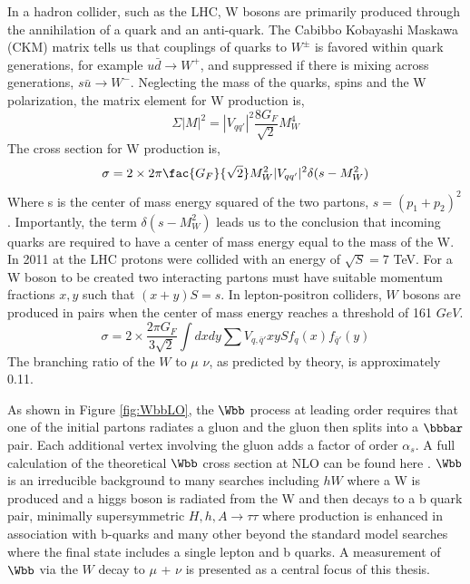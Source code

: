 In a hadron collider, such as the LHC, W bosons are primarily produced
through the annihilation of a quark and an anti-quark. 
The Cabibbo Kobayashi Maskawa (CKM) matrix tells us that%
couplings of quarks to $W^{\pm}$ is favored within quark generations, for example
$u\bar{d}\rightarrow W^{+}$,
and suppressed if there is mixing across generations, $s\bar{u}\rightarrow W^{-}$.
Neglecting the mass of the quarks, spins and the W polarization, the matrix element
for W production is,
\begin{equation}
\Sigma|M|^{2}=|V_{qq'}|^{2}\frac{8G_{F}}{\sqrt{2}}M_{W}^{4}
\end{equation}
The cross section for W production is,
\begin{equation}
\sigma=2\times2\pi\fac{G_{F}}{\sqrt{2}}M_{W}^{2}|V_{qq'}|^{2}\delta(s-M_{W}^{2})
\end{equation}
Where s is the center of mass energy squared of the two partons, $s=(p_{1}+p_{2})^{2}$.
Importantly, the term $\delta(s-M_{W}^{2})$ leads us to the 
conclusion that incoming quarks are required to have a center of mass energy
equal to the mass of the W. 
In 2011 at the LHC protons were collided with an energy of $\sqrt{S}=7$ TeV.
For a W boson to be created two interacting partons must have suitable
momentum fractions $x, y$ such that $(x+y)S=s$.
In lepton-positron colliders, $W$ bosons are produced in pairs when 
the center of mass energy reaches a threshold of 161 $GeV$. 
\begin{equation}
\sigma=2\times\frac{2\pi G_{F}}{3\sqrt{2}}\int{dxdy \sum{V_{q,\bar{q}'}}xyS f_{q}(x)f_{\bar{q}'}(y)}
\end{equation}
The branching ratio of the $W$ to $\mu$ $\nu$, as predicted by theory, is approximately 0.11. 

As shown in Figure \ref{fig:WbbLO}, the $\Wbb$ process at leading order requires that one of the initial partons
radiates a gluon and the gluon then splits into a $\bbbar$ pair. Each additional
vertex involving the gluon adds a factor of order $\alpha_{s}$. A full
calculation of the theoretical $\Wbb$ cross section at NLO can be found here \cite{Campbell:2010ff, Badger:2010mg}.
$\Wbb$ is an irreducible background to many searches including
$hW$ where a W is produced and a higgs boson is radiated from the W
and then decays to a b quark pair, minimally supersymmetric $H,h,A\rightarrow \tau\tau$
where production is enhanced in association with b-quarks and many other beyond the standard
model searches where the final state includes a single lepton and b quarks. 
A measurement of $\Wbb$ via the $W$ decay to $\mu$ + $\nu$ is presented as a 
central focus of this thesis.

